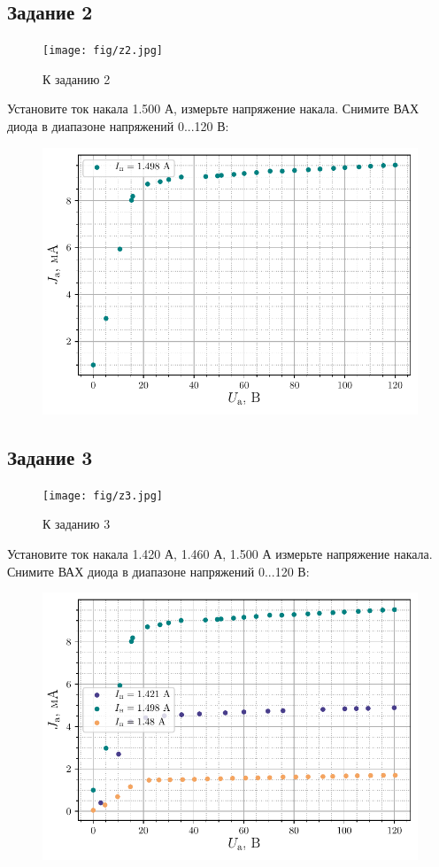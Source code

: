 \subsection{Задание 2}

\begin{figure}[H]
	\centering
	\texttt{[image: fig/z2.jpg]}
	\caption{К заданию 2}
	\label{fig:14}
\end{figure}

Установите ток накала 1.500 А, измерьте напряжение накала. Снимите ВАХ диода в диапазоне напряжений 0...120 В:

\begin{figure}[H]
	\centering
    \includegraphics[width=0.85\linewidth]{scripts/fig2}
	\caption{}
	\label{fig:15}
\end{figure}

\subsection{Задание 3}

\begin{figure}[h!]
	\centering
	\texttt{[image: fig/z3.jpg]}
	\caption{К заданию 3}
	\label{fig:16}
\end{figure}

Установите ток накала 1.420 А, 1.460 А, 1.500 А измерьте напряжение накала. Снимите ВАХ диода в диапазоне напряжений 0...120 В:

\begin{figure}[H]
	\centering
    \includegraphics[width=0.85\linewidth]{scripts/fig3}
	\caption{}
	\label{fig:17}
\end{figure}

